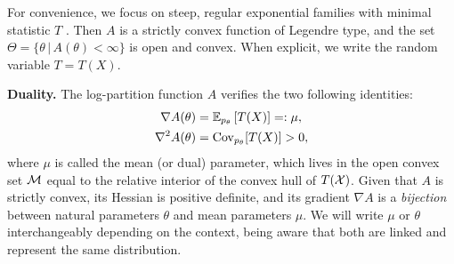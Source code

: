 \documentclass[twoside]{article}
\newcommand*{\expect}[2][]{\ensuremath{\mathbb{E}_{#1} \left[ #2 \right] }} %
\newcommand{\cond}{\,\vert\,}
\newcommand{\logpart}{A}
\newcommand{\nat}{\theta}
\newcommand{\m}{\mu}
\newcommand{\meanp}{\m}
\begin{document}
For convenience, we focus on steep, regular exponential families with minimal statistic $T$ \citep{barndoffnielsen2014information}.
Then $\logpart$ is a strictly convex function of Legendre type,
and the set $\Theta = \{ \nat \cond \logpart(\nat) < \infty\}$ is open and convex.
When explicit, we write the random variable $T = T(X)$.


{\bf Duality.}
The log-partition function $\logpart$ verifies the two following identities:
\begin{align}
    \nabla\logpart(\nat) &=  \expect[p_\nat]{T(X)} =: \meanp, \\
    \nabla^2 \logpart(\nat) &= \Cov_{p_\nat}[T(X)] > 0,
\end{align}
where $\meanp$ is called the mean (or dual) parameter, which lives in the open convex set ${\mathcal M}$ equal to the relative interior of the convex hull of $T({\mathcal X})$.
Given that $\logpart$ is strictly convex, its Hessian is positive definite, and its gradient $\nabla \logpart$ is a \textit{bijection} between natural parameters $\nat$ and mean parameters $\m$.
We will write $\m$ or $\nat$ interchangeably depending on the context, being aware that both are linked and represent the same distribution.
\end{document}
